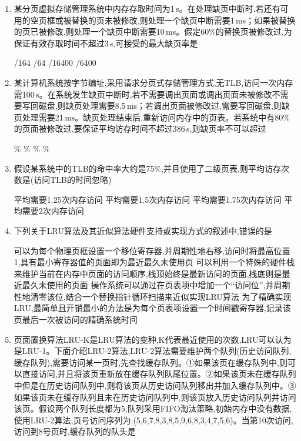 \documentclass[12pt, a4paper, oneside, UTF8]{ctexbook}
\begin{document}
\begin{enumerate}
    \item 某分页虚拟存储管理系统中内存存取时间为1\,\textmu s。在处理缺页中断时,若还有可用的空页框或被替换的页未被修改,则处理一个缺页中断需要1\,ms；如果被替换的页已被修改,则处理一个缺页中断需要10\,ms。假定60\%的替换页被修改过,为保证有效存取时间不超过3\,\textmu s,可接受的最大缺页率是
    \begin{choices}[1]
    /164
    /64
    /16400
    /6400
    \end{choices}

    \item 某计算机系统按字节编址,采用请求分页式存储管理方式,无TLB,访问一次内存需100\,\textmu s。在系统发生缺页中断时,若不需要调出页面或调出页面未被修改不需要写回磁盘,则缺页处理需要8.5\,ms；若调出页面被修改过,需要写回磁盘,则缺页处理需要21\,ms。缺页处理结束后,重新访问内存中的页表。若系统中有80\%的页面被修改过,要保证平均访存时间不超过386\,\textmu s,则缺页率不可以超过
    \begin{choices}[1]
    \%
    \%
    \%
    \%
    \end{choices}

    \item 假设某系统中的TLB的命中率大约是75\%,并且使用了二级页表,则平均访存次数是(访问TLB的时间忽略)
    \begin{choices}[1]
    \task 平均需要1.25次内存访问
    \task 平均需要1.5次内存访问
    \task 平均需要1.75次内存访问
    \task 平均需要2次内存访问
    \end{choices}

    \item 下列关于LRU算法及其近似算法硬件支持或实现方式的叙述中,错误的是
    \begin{choices}[1]
    \task 可以为每个物理页框设置一个移位寄存器,并周期性地右移,访问时将最高位置1,具有最小寄存器值的页面即为最近最久未使用页
    \task 可以利用一个特殊的硬件栈来维护当前在内存中页面的访问顺序,栈顶始终是最新访问的页面,栈底则是最近最久未使用的页面
    \task 操作系统可以通过在页表项中增加一个“访问位”,并周期性地清零该位,结合一个替换指针循环扫描来近似实现LRU算法
    \task 为了精确实现LRU,最简单且开销最小的方法是为每个页表项设置一个时间戳寄存器,记录该页最后一次被访问的精确系统时间
    \end{choices}

    \item 页面置换算法LRU-K是LRU算法的变种,K代表最近使用的次数,LRU可以认为是LRU-1。下面介绍LRU-2算法,LRU-2算法需要维护两个队列(历史访问队列,缓存队列),需要访问某一页时,先查找缓存队列。①如果该页在缓存队列中,则可以直接访问,并且将该页重新放在缓存队列队尾位置。②如果该页未在缓存队列中但是在历史访问队列中,则将该页从历史访问队列移出并加入缓存队列中。③如果该页未在缓存队列且未在历史访问队列中,则该页放入历史访问队列并访问该页。假设两个队列长度都为5,队列采用FIFO淘汰策略,初始内存中没有数据,使用LRU-2算法,页号访问序列为:(5,6,7,8,3,8,5,9,6,8,3,4,7,5,6)。当第10次访问,访问到8号页时,缓存队列的队头是
    \begin{choices}[1]
    \end{choices}


\end{enumerate}
\end{document}
